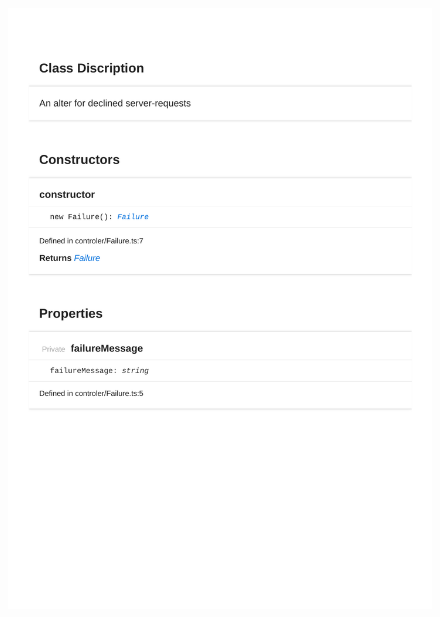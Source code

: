 \begin{figure}[H]
\centerline{\includegraphics[width=1\textwidth]{FrontendDocsAsPDF/Model/Failure.pdf}}
\end{figure}

